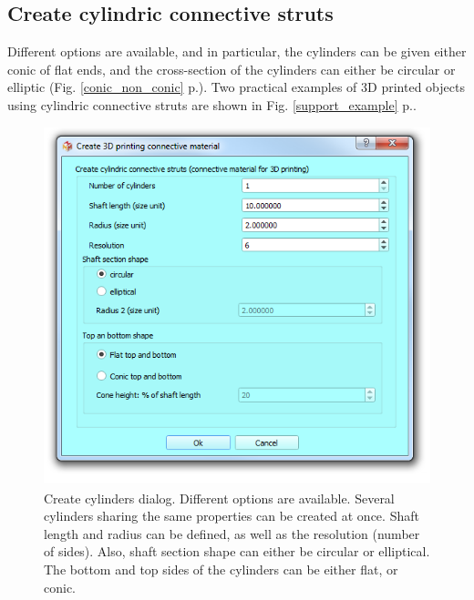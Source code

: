\subsection{Create cylindric connective struts}
Different options are available, and in particular, the cylinders can be given either conic of flat ends, and the cross-section of the cylinders can either be circular or elliptic (Fig. \ref{conic_non_conic} p.\pageref{conic_non_conic}). 
Two practical examples of 3D printed objects using cylindric connective struts are shown in Fig. \ref{support_example} p.\pageref{support_example}.
\begin{figure}
  \centering
  \includegraphics[scale=0.5]{images/09/create_3D_primitives/cylinders_dialog.png} 
	\caption{Create cylinders dialog. Different options are available. Several cylinders sharing the same properties can be created at once. Shaft length and radius can be defined, as well as the resolution (number of sides). Also, shaft section shape can either be circular or elliptical. The bottom and top sides of the cylinders can be either flat, or conic.}
 \label{cylinders_dialog}
\end{figure}

